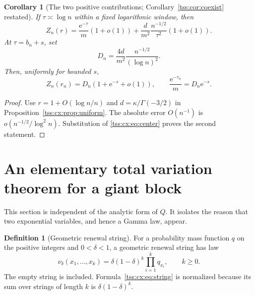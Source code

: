 \documentclass[11pt]{article}
\newtheorem{corollary}[theorem]{Corollary}
\theoremstyle{remark}\newtheorem{remark}[theorem]{Remark}
\theoremstyle{definition}\newtheorem{definition}[theorem]{Definition}
\newcommand{\e}{\mathrm e}
\begin{document}
\begin{corollary}[The two positive contributions; Corollary~\ref{tss:cor:coexist} restated]\label{tss:cx:cor:twoterms}
If $\tau\asymp\log n$ within a fixed logarithmic window, then
\begin{equation}\label{tss:cx:eq:twoterms}
 Z_n(r)=\frac{\e^{-\tau}}m(1+o(1))
       +\frac{d}{m^2}\frac{n^{-1/2}}{\tau^2}(1+o(1)).
\end{equation}
At $\tau=b_n+s$, set
\begin{equation}\label{tss:cx:eq:Dn}
 D_n=\frac{4d}{m^2}\frac{n^{-1/2}}{(\log n)^2}.
\end{equation}
Then, uniformly for bounded $s$,
\begin{equation}\label{tss:cx:eq:Zcoexist}
 Z_n(r_n)=D_n(1+\e^{-s}+o(1)),\qquad
 \frac{\e^{-\tau_n}}m=D_n\e^{-s}.
\end{equation}
\end{corollary}
\begin{proof}
Use $r=1+O(\log n/n)$ and $d=\kappa/\Gamma(-3/2)$ in
Proposition~\ref{tss:cx:prop:uniform}. The absolute error $O(n^{-1})$ is
$o(n^{-1/2}/\log^2 n)$. Substitution of \eqref{tss:cx:eq:center} proves the
second statement.
\end{proof}

\section{An elementary total variation theorem for a giant block}
\label{tss:cx:sec:TV}
This section is independent of the analytic form of $Q$. It isolates
the reason that two exponential variables, and hence a Gamma law,
appear.

\begin{definition}[Geometric renewal string]
For a probability mass function $q$ on the positive integers and
$0<\delta<1$, a geometric renewal string has law
\begin{equation}\label{tss:cx:eq:string}
 \nu_\delta(x_1,\ldots,x_k)
   =\delta(1-\delta)^k\prod_{i=1}^k q_{x_i},
 \qquad k\ge0.
\end{equation}
The empty string is included. Formula~\eqref{tss:cx:eq:string} is normalized
because its sum over strings of length $k$ is
$\delta(1-\delta)^k$.
\end{definition}
\end{document}
